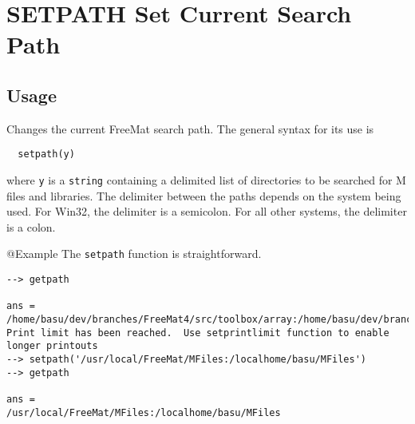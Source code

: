 \section{SETPATH Set Current Search Path}

\subsection{Usage}

Changes the current FreeMat search path.  The general syntax for
its use is
\begin{verbatim}
  setpath(y)
\end{verbatim}
where \verb|y| is a \verb|string| containing a delimited list of directories
to be searched for M files and libraries.  
The delimiter between the paths depends on the system being used.  For Win32, the
delimiter is a semicolon.  For all other systems, the delimiter is a colon.

@Example
The \verb|setpath| function is straightforward.
\begin{verbatim}
--> getpath

ans = 
/home/basu/dev/branches/FreeMat4/src/toolbox/array:/home/basu/dev/branches/FreeMat4/src/toolbox:/home/basu/dev/branches/FreeMat4/src/toolbox/binary:/home/basu/dev/branches/FreeMat4/src/toolbox/fitting:/home/basu/dev/branches/FreeMat4/src/toolbox/func:/home/basu/dev/branches/FreeMat4/src/toolbox/funfun:/home/basu/dev/branches/FreeMat4/src/toolbox/general:/home/basu/dev/branches/FreeMat4/src/toolbox/geom:/home/basu/dev/branches/FreeMat4/src/toolbox/graph:/home/basu/dev/branches/FreeMat4/src/toolbox/help:/home/basu/dev/branches/FreeMat4/src/toolbox/io:/home/basu/dev/branches/FreeMat4/src/toolbox/matrix:/home/basu/dev/branches/FreeMat4/src/toolbox/mpi:/home/basu/dev/branches/FreeMat4/src/toolbox/numerical:/home/basu/dev/branches/FreeMat4/src/toolbox/os:/home/basu/dev/branches/FreeMat4/src/toolbox/poly:/home/basu/dev/branches/FreeMat4/src/toolbox/random:/home/basu/dev/branches/FreeMat4/src/toolbox/signal:/home/basu/dev/branches/FreeMat4/src/toolbox/sparse:/home/basu/dev/branches/FreeMat4/sr
Print limit has been reached.  Use setprintlimit function to enable longer printouts
--> setpath('/usr/local/FreeMat/MFiles:/localhome/basu/MFiles')
--> getpath

ans = 
/usr/local/FreeMat/MFiles:/localhome/basu/MFiles
\end{verbatim}
